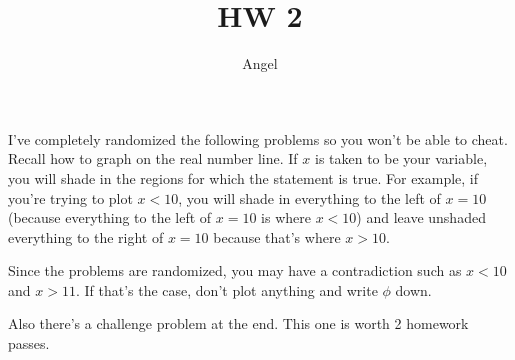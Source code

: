 \documentclass[12pt]{article}
\begin{document}
			\title{HW 2}
			\author{Angel}
			\date{}
			\maketitle
I've completely randomized the following problems so you won't be able to cheat. Recall how to 
graph on the real number line. If $x$ is taken
to be your variable, you will shade in the regions for which the statement is true. For example, if you're
trying to plot $x < 10$, you will shade in everything to the left of $x = 10$ (because everything to the 
left of $x = 10$ is where $x < 10$) and leave unshaded everything to the right of $x = 10$ because that's where
$x > 10$.

Since the problems are randomized, you may have a contradiction such as $x < 10$ and $x > 11$. If that's the case,
don't plot anything and write $\phi$ down.

Also there's a challenge problem at the end. This one is worth 2 homework passes.
\end{document}
